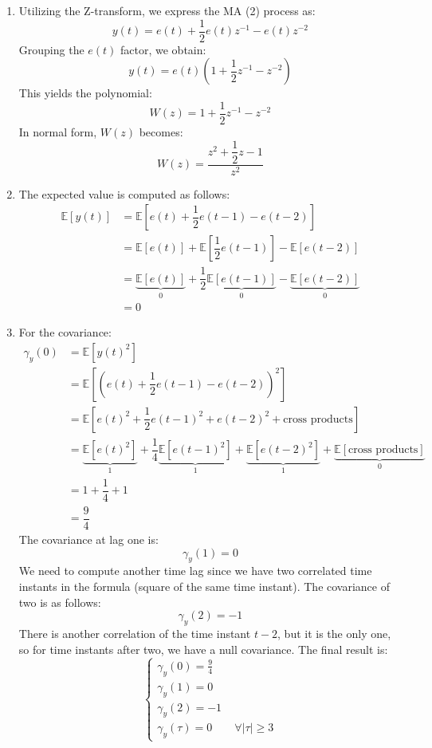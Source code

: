 \begin{enumerate}
    \item Utilizing the Z-transform, we express the MA (2) process as:
        \[y(t)=e(t)+\dfrac{1}{2}e(t)z^{-1}-e(t)z^{-2}\]
        Grouping the $e(t)$ factor, we obtain:
        \[y(t)=e(t)\left(1+\dfrac{1}{2}z^{-1}-z^{-2}\right)\]
        This yields the polynomial:
        \[W(z)=1+\dfrac{1}{2}z^{-1}-z^{-2}\]
        In normal form, $W(z)$ becomes:
        \[W(z)=\dfrac{z^2+\dfrac{1}{2}z-1}{z^2}\]
    \item The expected value is computed as follows:
        \begin{align*}
            \mathbb{E}\left[y(t)\right]     &= \mathbb{E}\left[e(t)+\dfrac{1}{2}e(t-1)-e(t-2)\right] \\
                                            &= \mathbb{E}\left[e(t)\right]+\mathbb{E}\left[\dfrac{1}{2}e(t-1)\right]-\mathbb{E}\left[e(t-2)\right] \\
                                            &= \underbrace{\mathbb{E}\left[e(t)\right]}_0 +\dfrac{1}{2}\underbrace{\mathbb{E}\left[e(t-1)\right]}_0 -\underbrace{\mathbb{E}\left[e(t-2)\right]}_0  \\
                                            &= 0
        \end{align*}
    \item For the covariance:
        \begin{align*}
            \gamma_y(0)     &= \mathbb{E}\left[{y(t)}^2\right] \\
                            &= \mathbb{E}\left[{\left( e(t)+\dfrac{1}{2}e(t-1)-e(t-2) \right)}^2\right] \\
                            &= \mathbb{E}\left[ {e(t)}^2 + \dfrac{1}{2}{e(t-1)}^2 + {e(t-2)}^2  + \text{cross products} \right] \\
                            &= \underbrace{\mathbb{E}\left[ {e(t)}^2 \right]}_1  + \dfrac{1}{4}\underbrace{\mathbb{E}\left[{e(t-1)}^2\right]}_1  + \underbrace{\mathbb{E}\left[{e(t-2)}^2\right]}_1  + \underbrace{\mathbb{E}\left[\text{cross products}\right]}_0  \\
                            &= 1  + \dfrac{1}{4} + 1\\
                            &= \dfrac{9}{4}
        \end{align*}
        The covariance at lag one is:
        \[\gamma_y(1)=0\]
        We need to compute another time lag since we have two correlated time instants in the formula (square of the same time instant).
        The covariance of two is as follows:
        \[\gamma_y(2)=-1\]
        There is another correlation of the time instant $t-2$, but it is the only one, so for time instants after two, we have a null covariance.
        The final result is:
        \[\begin{cases}
            \gamma_y(0)=\frac{9}{4} \\
            \gamma_y(1)=0 \\
            \gamma_y(2)=-1 \\
            \gamma_y(\tau)=0 \qquad \forall\left\lvert \tau\right\rvert \geq 3
        \end{cases}\]
\end{enumerate}